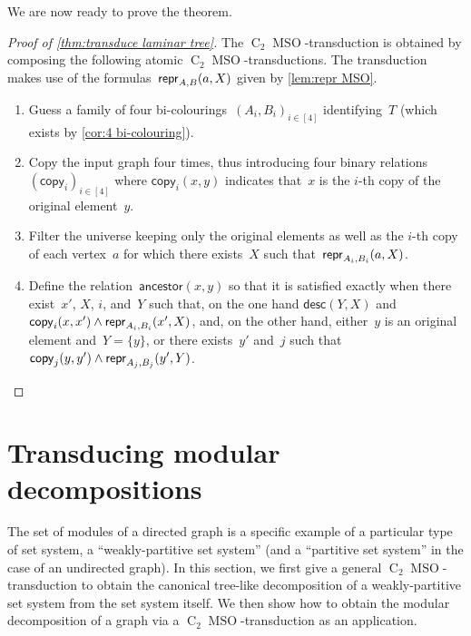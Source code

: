 \documentclass{lmcs} %
\newcommand{\MSO}{\ensuremath{\operatorname{MSO}}\xspace}
\newcommand{\CMSO}[1][]{\ensuremath{\C[#1]{\!\!}\MSO}\xspace}
\newcommand{\C}[1][]{\ensuremath{\operatorname{C}_{#1}}\xspace}
\newcommand{\ancestor}{\mathsf{ancestor}}
\newcommand{\copyV}[1][]{\ensuremath{\mathsf{copy}_{#1}}\xspace}
\newcommand{\descendant}{\ensuremath{\mathsf{desc}}\xspace}
\begin{document}
We are now ready to prove the theorem.
\begin{proof}[Proof of \autoref{thm:transduce laminar tree}]
    The \CMSO[2]-transduction is obtained by composing the following atomic \CMSO[2]-transductions.
    The transduction makes use of the formulas~$\repr_{A, B}(a, X)$
    given by \autoref{lem:repr MSO}.
    \begin{enumerate}
        \item Guess a family of four bi-colourings~$(A_i, B_i)_{i\in[4]}$
            identifying~$T$
            (which exists by \autoref{cor:4 bi-colouring}).
        \item Copy the input graph four times,
            thus introducing four binary relations~$(\copyV[i])_{i\in[4]}$
            where $\copyV[i](x, y)$ indicates that~$x$ is the $i$-th copy
            of the original element~$y$.
        \item Filter the universe
            keeping only
            the original elements
            as well as
            the $i$-th copy of each vertex~$a$
            for which there exists~$X$
            such that~$\repr_{A_i, B_i}(a, X)$.
        \item Define the relation~$\ancestor(x, y)$
            so that it is satisfied exactly when
            there exist~$x'$, $X$, $i$, and~$Y$
            such that,
            on the one hand
            $\descendant(Y, X)$
            and
            $\copyV[i](x,x')\land\repr_{A_i, B_i}(x', X)$,
            and,
            on the other hand,
            either~$y$ is an original element and~$Y=\{y\}$,
            or there exists~$y'$ and~$j$ such that
            $\copyV[j](y, y')\land\repr_{A_j, B_j}(y', Y)$.%
    \end{enumerate}
\end{proof}

\section{Transducing modular decompositions}
\label{sec:transduce modular decomposition}
The set of modules of a directed graph is a specific example of a particular type of set system, a ``weakly-partitive set system'' (and a ``partitive set system'' in the case of an undirected graph). In this section, we first give a general \CMSO[2]-transduction to obtain the canonical tree-like decomposition of a weakly-partitive set system from the set system itself. We then show how to obtain the modular decomposition of a graph via a \CMSO[2]-transduction as an application.
\end{document}
